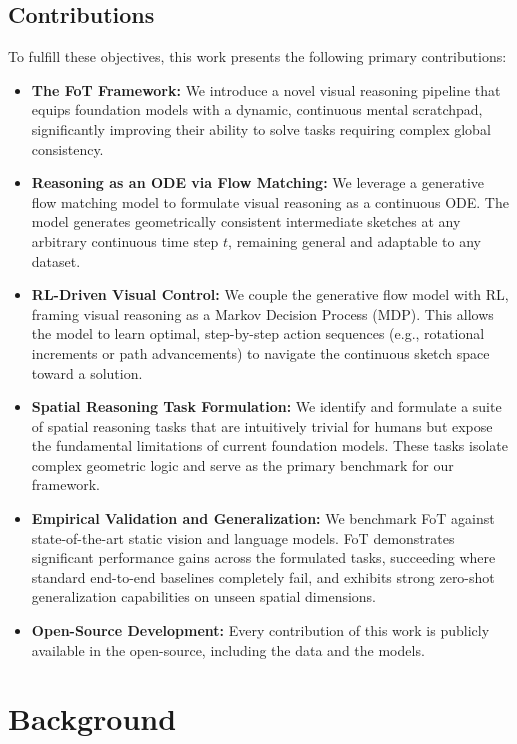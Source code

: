 \documentclass{l4proj}
\begin{document}
\section{Contributions}
To fulfill these objectives, this work presents the following primary contributions:
\begin{itemize}
    \item \textbf{The FoT Framework:} We introduce a novel visual reasoning pipeline that equips foundation models with a dynamic, continuous mental scratchpad, significantly improving their ability to solve tasks requiring complex global consistency.
    \item \textbf{Reasoning as an ODE via Flow Matching:} We leverage a generative flow matching model to formulate visual reasoning as a continuous ODE. The model generates geometrically consistent intermediate sketches at any arbitrary continuous time step $t$, remaining general and adaptable to any dataset.
    \item \textbf{RL-Driven Visual Control:} We couple the generative flow model with RL, framing visual reasoning as a Markov Decision Process (MDP). This allows the model to learn optimal, step-by-step action sequences (e.g., rotational increments or path advancements) to navigate the continuous sketch space toward a solution.
    \item \textbf{Spatial Reasoning Task Formulation:} We identify and formulate a suite of spatial reasoning tasks that are intuitively trivial for humans but expose the fundamental limitations of current foundation models. These tasks isolate complex geometric logic and serve as the primary benchmark for our framework.
    \item \textbf{Empirical Validation and Generalization:} We benchmark FoT against state-of-the-art static vision and language models. FoT demonstrates significant performance gains across the formulated tasks, succeeding where standard end-to-end baselines completely fail, and exhibits strong zero-shot generalization capabilities on unseen spatial dimensions.
    \item \textbf{Open-Source Development:} Every contribution of this work is publicly available in the open-source, including the data and the models.
\end{itemize}



\chapter{Background}
\end{document}
